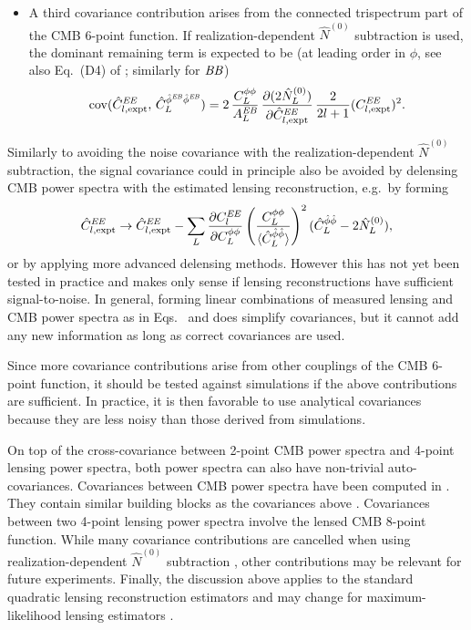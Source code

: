 \begin{itemize}
\item A third covariance contribution  arises from the connected trispectrum part of the CMB 6-point function. If realization-dependent $\hat N^{(0)}$  subtraction is used, the dominant remaining term is expected to be (at leading order in $\phi$, see also Eq.~(D4) of \cite{marcel1308}; similarly for $\mathit{BB}$)
\begin{equation}
  \label{eq:cov_EBEB_EE}
      \mathrm{cov}(\hat C_{l,\mathrm{expt}}^{\mathit{EE}},\, \hat C_L^{\hat\phi^{\mathit{EB}}\hat\phi^{\mathit{EB}}}) = 
2\,\frac{C^{\phi\phi}_L}{A_L^{\mathit{EB}}}\,
\frac{\partial (2\hat N_L^{(0)})}{\partial \hat C^{\mathit{EE}}_{l,\mathrm{expt}}}\,
\frac{2}{2l+1}
(C^{\mathit{EE}}_{l,\mathrm{expt}})^2.
\end{equation}

\end{itemize}

Similarly to avoiding the noise covariance with the realization-dependent $\hat N^{(0)}$ subtraction, the signal covariance could in principle also be avoided by delensing CMB power spectra with the estimated lensing reconstruction, e.g.~by forming \cite{marcel1308}
\begin{equation}
  \label{eq:matter_CV_mitigation}
  \hat{C}^{\mathit{EE}}_{l,\mathrm{expt}} \to  \hat{C}^{\mathit{EE}}_{l,\mathrm{expt}}- 
\sum_{L} 
 \frac{\partial C_{l}^{\mathit{EE}}}{\partial C_{L}^{\phi\phi}}
\left(\frac{C_{L}^{\phi\phi}}{\langle
\hat{C}_{L}^{\hat{\phi}\hat{\phi}}\rangle}\right)^2
(\hat{C}_{L}^{\hat{\phi}\hat{\phi}}-2\hat{N}_{L}^{(0)}),
\end{equation}
or by applying more advanced delensing methods.  However this has not yet been tested in practice and makes only sense if lensing reconstructions have sufficient signal-to-noise.  In general, forming linear combinations of measured lensing and CMB power spectra as in Eqs.~ and  does simplify covariances, but it cannot add any new information as long as correct covariances are used.

Since more covariance contributions arise from other couplings of the CMB 6-point function, it should be tested against simulations if the above contributions are sufficient.  In practice, it is then favorable to use analytical covariances because they are less noisy than those derived from simulations.   
 
On top of the cross-covariance between 2-point CMB power spectra and 4-point lensing power spectra, both power spectra can also have non-trivial auto-covariances.  Covariances between CMB power spectra have been computed in \cite{2006PhRvD..74l3002S,2007PhRvD..75h3501L,BenoitSmithHu1205}. They contain similar building blocks as the covariances above \cite{BenoitSmithHu1205}.  Covariances between two 4-point lensing power spectra involve the lensed CMB 8-point function.  While many covariance contributions are cancelled when using realization-dependent $\hat N^{(0)}$ subtraction \cite{duncan1008}, other contributions may be relevant for future experiments.  Finally, the discussion above applies to the standard quadratic lensing reconstruction estimators and may change for maximum-likelihood lensing estimators \cite{HirataSeljak0209489}.

